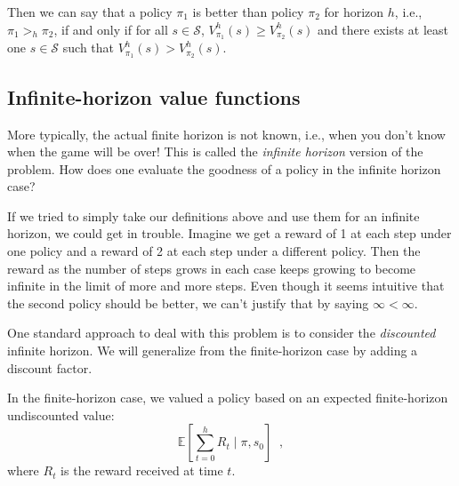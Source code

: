 

Then we can say that a policy $\pi_1$ is better than policy $\pi_2$ for horizon
$h$, i.e., $\pi_1 >_h \pi_2$, if and only if for all $s \in \mathcal S$,
$V_{\pi_1}^h(s) \geq V_{\pi_2}^h(s)$ and there exists at least one $s
  \in \mathcal S$ such that $V_{\pi_1}^h(s) > V_{\pi_2}^h(s)$.

\subsection{Infinite-horizon value functions}
\label{sec-mdp_infinite_horizon}
\label{sec-discount}

More typically, the actual finite horizon is not known, i.e., when you
don't know when the game will be over!  This is called the {\em
    infinite horizon} version of the problem.  How does one evaluate the
goodness of a policy in the infinite horizon case?

If we tried to simply take our definitions above and use them for an
infinite horizon, we could get in trouble. Imagine we get a reward of
1 at each step under one policy and a reward of 2 at each step under a
different policy. Then the reward as the number of steps grows in each
case keeps growing to become infinite in the limit of more and more
steps. Even though it seems intuitive that the second policy should
be better, we can't justify that by saying $\infty < \infty$.

One standard approach to deal with this problem is to consider the
\emph{discounted} infinite horizon.
We will generalize from the finite-horizon case by adding a discount factor.

In the finite-horizon case, we valued a
policy based on an expected finite-horizon undiscounted value:
\begin{equation}
  \mathbb{E}\left[\sum_{t = 0}^{h}R_t \mid \pi, s_0\right]\;\;,
  \label{eq:exp_finite}
\end{equation}
where $R_t$ is the reward received at time $t$.

